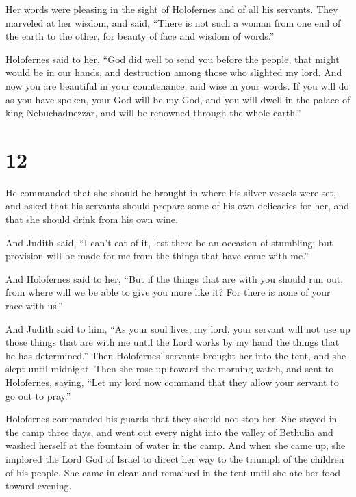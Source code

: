  Her words were pleasing in the sight of Holofernes and of
all his servants. They marveled at her wisdom, and said, 
``There is not such a woman from one end of the earth to the other, for
beauty of face and wisdom of words.''

 Holofernes said to her, ``God did well to send you before
the people, that might would be in our hands, and destruction among
those who slighted my lord.  And now you are beautiful in
your countenance, and wise in your words. If you will do as you have
spoken, your God will be my God, and you will dwell in the palace of
king Nebuchadnezzar, and will be renowned through the whole earth.''

\hypertarget{section-11}{%
\section{12}\label{section-11}}

 He commanded that she should be brought in where his silver
vessels were set, and asked that his servants should prepare some of his
own delicacies for her, and that she should drink from his own wine.

 And Judith said, ``I can't eat of it, lest there be an
occasion of stumbling; but provision will be made for me from the things
that have come with me.''

 And Holofernes said to her, ``But if the things that are
with you should run out, from where will we be able to give you more
like it? For there is none of your race with us.''

 And Judith said to him, ``As your soul lives, my lord, your
servant will not use up those things that are with me until the Lord
works by my hand the things that he has determined.''  Then
Holofernes' servants brought her into the tent, and she slept until
midnight. Then she rose up toward the morning watch,  and
sent to Holofernes, saying, ``Let my lord now command that they allow
your servant to go out to pray.''

 Holofernes commanded his guards that they should not stop
her. She stayed in the camp three days, and went out every night into
the valley of Bethulia and washed herself at the fountain of water in
the camp.  And when she came up, she implored the Lord God
of Israel to direct her way to the triumph of the children of his
people.  She came in clean and remained in the tent until
she ate her food toward evening.

